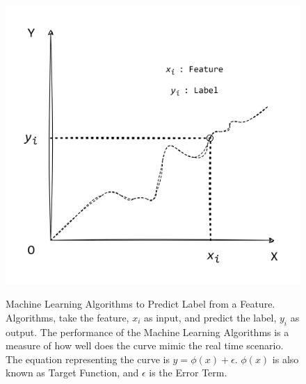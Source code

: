 \documentclass[sn-mathphys]{sn-jnl}%
\theoremstyle{thmstyleone}%
\theoremstyle{thmstyletwo}%
\theoremstyle{thmstylethree}%
\begin{document}
\begin{figure}[!h]
\centering
\includegraphics[width=\textwidth]{1}
\label{fig1}
\caption{Machine Learning Algorithms to Predict Label from a Feature. Algorithms, take the feature, $x_i$ as input, and predict the label, $y_i$ as output. The performance of the Machine Learning Algorithms is a measure of how well does the curve mimic the real time scenario. The equation representing the curve is $y = \phi(x) + \epsilon$. $\phi(x)$ is also known as Target Function, and $\epsilon$ is the Error Term.}
\label{Fig. 1}
\end{figure}
\end{document}
